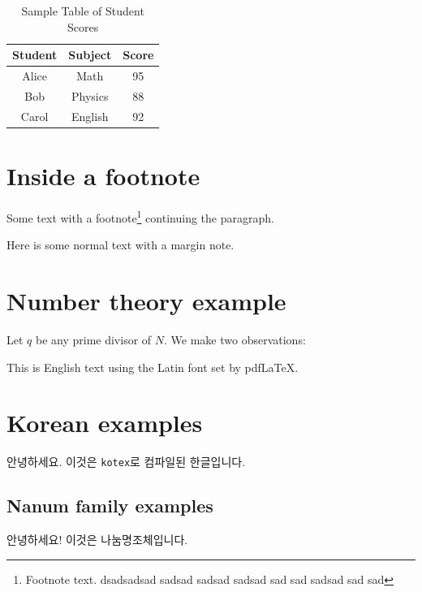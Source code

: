 \documentclass[12pt]{book}
\begin{document}
  \lipsum[1-2]
  \begin{table}[h!]
    \centering
    \caption{Sample Table of Student Scores} %
    \begin{tabular}{|c|c|c|}
      \hline
      Student & Subject & Score \\
      \hline
      Alice   & Math    & 95    \\
      Bob     & Physics & 88    \\
      Carol   & English & 92    \\
      \hline
    \end{tabular}
    \label{tab:scores} %
  \end{table}

  \section{Inside a footnote}

  Some text with a footnote\footnote{Footnote text. 
  dsadsadsad 
  sadsad sadsad sadsad sad sad sadsad \lipsum[1-2] sad sad } continuing the paragraph.



  Here is some normal text with a margin note.








    
  \section{Number theory example}
  Let $q$ be any prime divisor of \(N\). We make two observations:

  This is English text using the Latin font set by pdfLaTeX.

  \section{Korean examples}
  안녕하세요. 이것은 \texttt{kotex}로 컴파일된 한글입니다.

  \subsection{Nanum family examples}
  안녕하세요! 이것은 나눔명조체입니다.
\end{document}
